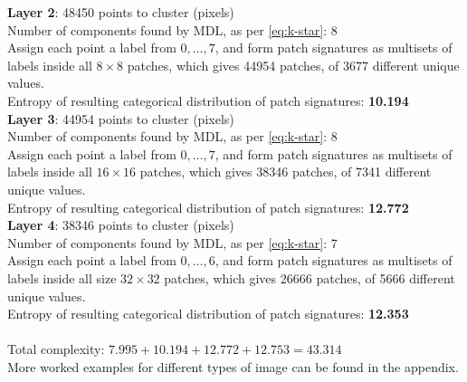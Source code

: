 \documentclass[a4paper,fleqn]{cas-sc}
\theoremstyle{remark}
\begin{document}
\noindent  \textbf{Layer 2}: 48450 points to cluster (pixels)  \\
Number of components found by MDL, as per \eqref{eq:k-star}: 8 \\
Assign each point a label from $0, \dots, 7$, and form patch signatures as multisets of labels inside all $8 \times 8$ patches, which gives 44954 patches, of 3677 different unique values. \\
Entropy of resulting categorical distribution of patch signatures: \textbf{10.194} \\

\noindent  \textbf{Layer 3}: 44954 points to cluster (pixels)  \\
Number of components found by MDL, as per \eqref{eq:k-star}: 8 \\
Assign each point a label from $0, \dots, 7$, and form patch signatures as multisets of labels inside all $16 \times 16$ patches, which gives 38346 patches, of 7341 different unique values. \\
Entropy of resulting categorical distribution of patch signatures: \textbf{12.772} \\

\noindent  \textbf{Layer 4}: 38346 points to cluster (pixels)  \\
Number of components found by MDL, as per \eqref{eq:k-star}: 7 \\
Assign each point a label from $0, \dots, 6$, and form patch signatures as multisets of labels inside all size $32 \times 32$ patches, which gives 26666 patches, of 5666 different unique values. \\
Entropy of resulting categorical distribution of patch signatures: \textbf{12.353} \\
\\
Total complexity: $7.995 + 10.194 + 12.772 + 12.753 = \boldsymbol{43.314}$
\\
More worked examples for different types of image can be found in the appendix.
\end{document}
